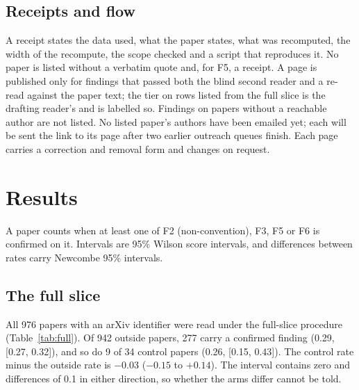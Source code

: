 \documentclass[reprint,amsmath,amssymb,aps,superscriptaddress,nofootinbib]{revtex4-2}
\begin{document}
\subsection{Receipts and flow}

A receipt states the data used, what the paper states, what was recomputed, the width of the recompute, the scope checked and a script that reproduces it. No paper is listed without a verbatim quote and, for F5, a receipt. A page is published only for findings that passed both the blind second reader and a re-read against the paper text; the tier on rows listed from the full slice is the drafting reader's and is labelled so. Findings on papers without a reachable author are not listed. No listed paper's authors have been emailed yet; each will be sent the link to its page after two earlier outreach queues finish. Each page carries a correction and removal form and changes on request.

\section{Results}

A paper counts when at least one of F2 (non-convention), F3, F5 or F6 is confirmed on it. Intervals are 95\% Wilson score intervals, and differences between rates carry Newcombe 95\% intervals.

\subsection{The full slice}
\label{sec:full}

All 976 papers with an arXiv identifier were read under the full-slice procedure (Table~\ref{tab:full}). Of 942 outside papers, 277 carry a confirmed finding (0.29, [0.27, 0.32]), and so do 9 of 34 control papers (0.26, [0.15, 0.43]). The control rate minus the outside rate is $-0.03$ ($-0.15$ to $+0.14$). The interval contains zero and differences of 0.1 in either direction, so whether the arms differ cannot be told.
\end{document}
